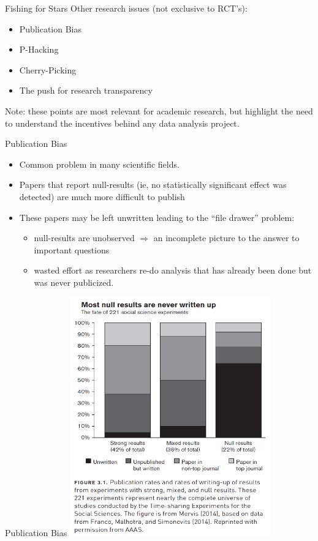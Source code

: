 \documentclass[
  ignorenonframetext,
]{beamer}
\begin{document}
\begin{frame}{Fishing for Stars}
\protect\hypertarget{fishing-for-stars}{}
Other research issues (not exclusive to RCT's):

\begin{itemize}
\item
  Publication Bias
\item
  P-Hacking
\item
  Cherry-Picking
\item
  The push for research transparency
\end{itemize}

Note: these points are most relevant for academic research, but
highlight the need to understand the incentives behind any data analysis
project.
\end{frame}

\begin{frame}{Publication Bias}
\protect\hypertarget{publication-bias}{}
\begin{itemize}
\item
  Common problem in many scientific fields.
\item
  Papers that report null-results (ie, no statistically significant
  effect was detected) are much more difficult to publish
\item
  These papers may be left unwritten leading to the ``file drawer''
  problem:

  \begin{itemize}
  \item
    null-results are unobserved \(\Rightarrow\) an incomplete picture to
    the answer to important questions
  \item
    wasted effort as researchers re-do analysis that has already been
    done but was never publicized.
  \end{itemize}
\end{itemize}
\end{frame}

\begin{frame}{Publication Bias}
\protect\hypertarget{publication-bias-1}{}
\centering \includegraphics[width=0.65\textwidth,height=\textheight]{"images/mervis.png"}
\end{frame}
\end{document}
